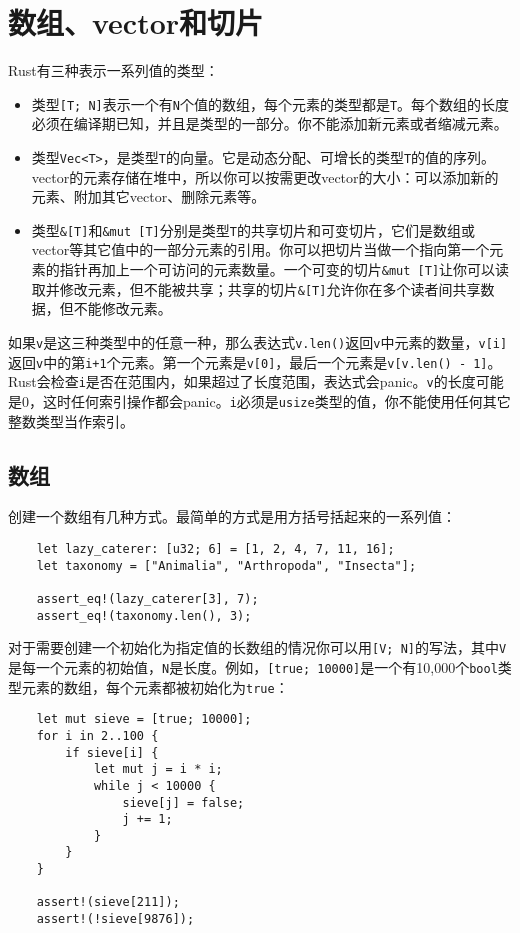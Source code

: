 \section{数组、vector和切片}
Rust有三种表示一系列值的类型：
\begin{itemize}
    \item 类型\texttt{[T; N]}表示一个有\texttt{N}个值的数组，每个元素的类型都是\texttt{T}。每个数组的长度必须在编译期已知，并且是类型的一部分。你不能添加新元素或者缩减元素。
    \item 类型\texttt{Vec<T>}，是类型\texttt{T}的向量。它是动态分配、可增长的类型\texttt{T}的值的序列。vector的元素存储在堆中，所以你可以按需更改vector的大小：可以添加新的元素、附加其它vector、删除元素等。
    \item 类型\texttt{\&[T]}和\texttt{\&mut [T]}分别是类型\texttt{T}的共享切片和可变切片，它们是数组或vector等其它值中的一部分元素的引用。你可以把切片当做一个指向第一个元素的指针再加上一个可访问的元素数量。一个可变的切片\texttt{\&mut [T]}让你可以读取并修改元素，但不能被共享；共享的切片\texttt{\&[T]}允许你在多个读者间共享数据，但不能修改元素。
\end{itemize}

如果\texttt{v}是这三种类型中的任意一种，那么表达式\texttt{v.len()}返回\texttt{v}中元素的数量，\texttt{v[i]}返回\texttt{v}中的第\texttt{i+1}个元素。第一个元素是\texttt{v[0]}，最后一个元素是\texttt{v[v.len() - 1]}。Rust会检查\texttt{i}是否在范围内，如果超过了长度范围，表达式会panic。\texttt{v}的长度可能是0，这时任何索引操作都会panic。\texttt{i}必须是\texttt{usize}类型的值，你不能使用任何其它整数类型当作索引。

\subsection{数组}
创建一个数组有几种方式。最简单的方式是用方括号括起来的一系列值：
\begin{verbatim}
    let lazy_caterer: [u32; 6] = [1, 2, 4, 7, 11, 16];
    let taxonomy = ["Animalia", "Arthropoda", "Insecta"];

    assert_eq!(lazy_caterer[3], 7);
    assert_eq!(taxonomy.len(), 3);
\end{verbatim}

对于需要创建一个初始化为指定值的长数组的情况你可以用\texttt{[V; N]}的写法，其中\texttt{V}是每一个元素的初始值，\texttt{N}是长度。例如，\texttt{[true; 10000]}是一个有10,000个\texttt{bool}类型元素的数组，每个元素都被初始化为\texttt{true}：
\begin{verbatim}
    let mut sieve = [true; 10000];
    for i in 2..100 {
        if sieve[i] {
            let mut j = i * i;
            while j < 10000 {
                sieve[j] = false;
                j += 1;
            }
        }
    }

    assert!(sieve[211]);
    assert!(!sieve[9876]);
\end{verbatim}

